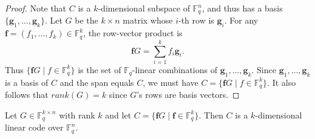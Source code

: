 \begin{proof}
Note that $C$ is a $k$-dimensional subspace of $\mathbb{F}_q^n$, and thus has a basis $\{\mathbf{g}_1, \ldots, \mathbf{g}_k\}$.
Let $G$ be the $k \times n$ matrix whose $i$-th row is $\mathbf{g}_i$.
For any $\mathbf{f} = (f_1, \ldots, f_k) \in \mathbb{F}_q^k$, the row-vector product is
\[
    \mathbf{f}G = \sum_{i=1}^k f_i \mathbf{g}_i.
\]
Thus $\{\mathbf{f}G \mid f \in \mathbb{F}^{k}_{q}\}$ is the set of $\mathbb{F}_q$-linear combinations of $\mathbf{g}_{1},\ldots, \mathbf{g}_{k}$. 
Since $\mathbf{g}_{1}, \ldots, \mathbf{g}_{k}$ is a basis of $C$ and the span equals $C$, we must have $C = \{\mathbf{f}G \mid f \in \mathbb{F}^{k}_{q}\}$. It also follows that $rank(G)=k$ since $G$'s rows are basis vectors.
\end{proof}

\begin{lemma}
    \label{lemma:generator-imp-subspace}
    Let $G \in \mathbb{F}^{k \times n}_{q}$ with rank $k$ and let $C = \{\mathbf{f}G \mid \mathbf{f} \in \mathbb{F}^{k}_{q}\}$.
    Then $C$ is a $k$-dimensional linear code over $\mathbb{F}^{n}_{q}$.
\end{lemma}

